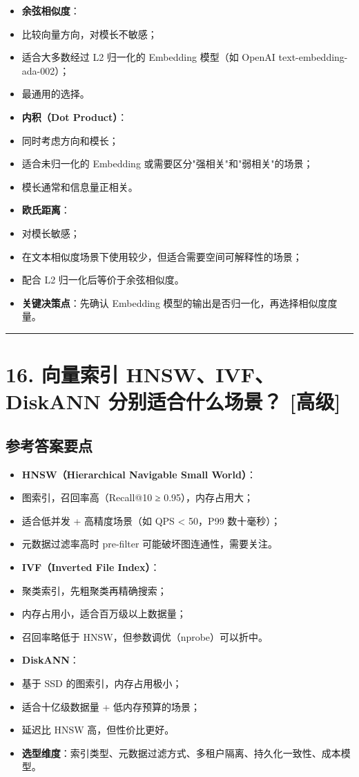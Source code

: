 \documentclass[9pt,a4paper,twocolumn]{ctexart}
\newcommand{\lvgao}{\usebox{\badgegaobox}}
\def\lvgao{[高级]}%
\begin{document}
\begin{itemize}[itemsep=1pt, topsep=2pt]
  \item \textbf{余弦相似度}：
  \item 比较向量方向，对模长不敏感；
  \item 适合大多数经过 L2 归一化的 Embedding 模型（如 OpenAI text-embedding-ada-002）；
  \item 最通用的选择。
  \item \textbf{内积（Dot Product）}：
  \item 同时考虑方向和模长；
  \item 适合未归一化的 Embedding 或需要区分"强相关"和"弱相关"的场景；
  \item 模长通常和信息量正相关。
  \item \textbf{欧氏距离}：
  \item 对模长敏感；
  \item 在文本相似度场景下使用较少，但适合需要空间可解释性的场景；
  \item 配合 L2 归一化后等价于余弦相似度。
  \item \textbf{关键决策点}：先确认 Embedding 模型的输出是否归一化，再选择相似度度量。
\end{itemize}


\vspace{2pt}
\noindent\rule{\columnwidth}{0.3pt}\vspace{2pt}



\section*{16. 向量索引 HNSW、IVF、DiskANN 分别适合什么场景？ \lvgao{}}


\subsection*{参考答案要点}

\begin{itemize}[itemsep=1pt, topsep=2pt]
  \item \textbf{HNSW（Hierarchical Navigable Small World）}：
  \item 图索引，召回率高（Recall@10 ≥ 0.95），内存占用大；
  \item 适合低并发 + 高精度场景（如 QPS < 50，P99 数十毫秒）；
  \item 元数据过滤率高时 pre-filter 可能破坏图连通性，需要关注。
  \item \textbf{IVF（Inverted File Index）}：
  \item 聚类索引，先粗聚类再精确搜索；
  \item 内存占用小，适合百万级以上数据量；
  \item 召回率略低于 HNSW，但参数调优（nprobe）可以折中。
  \item \textbf{DiskANN}：
  \item 基于 SSD 的图索引，内存占用极小；
  \item 适合十亿级数据量 + 低内存预算的场景；
  \item 延迟比 HNSW 高，但性价比更好。
  \item \textbf{选型维度}：索引类型、元数据过滤方式、多租户隔离、持久化一致性、成本模型。
\end{itemize}
\end{document}

